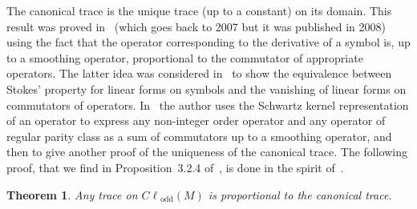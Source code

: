 \documentclass[11pt]{article}
\newtheorem{theorem}{Theorem}
\DeclareMathOperator{\odd}{odd} \DeclareMathOperator{\supp}{supp}
\def \Cl {{C\ell}}
\begin{document}
The canonical trace is the unique trace (up to a constant) on its domain. This result was proved in~\cite{maniccia} (which goes back to 2007 but it was published in 2008) using the fact that the operator corresponding to the derivative of a symbol is, up to a smoothing operator, proportional to the commutator of appropriate operators. The latter idea was considered in~\cite{sylvie} to show the equivalence between Stokes' property for linear forms on symbols and the vanishing of linear forms on commutators of operators. In~\cite{ponge} the author uses the Schwartz kernel representation of an operator to express any non-integer order operator and any operator of regular parity class as a sum of commutators up to a smoothing operator, and then to give another proof of the uniqueness of the canonical trace. The following proof, that we f\/ind in Proposition~3.2.4 of~\cite{ouedraogothese}, is done in the spirit of~\cite{maniccia}.

\begin{theorem}\label{prop:UniquenessTrace}
Any trace on $\Cl_{\odd}(M)$ is proportional to the canonical trace.
\end{theorem}
\end{document}
